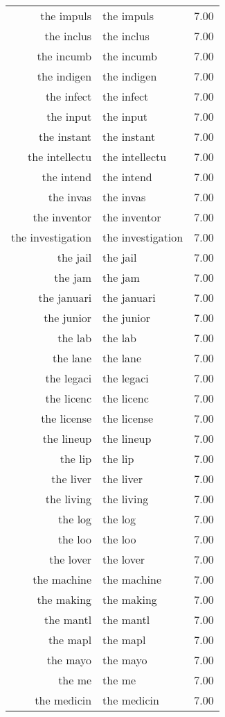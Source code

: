 \begin{table}[ht]
\begin{tabular}{rlr}
  the impuls & the impuls & 7.00 \\ 
  the inclus & the inclus & 7.00 \\ 
  the incumb & the incumb & 7.00 \\ 
  the indigen & the indigen & 7.00 \\ 
  the infect & the infect & 7.00 \\ 
  the input & the input & 7.00 \\ 
  the instant & the instant & 7.00 \\ 
  the intellectu & the intellectu & 7.00 \\ 
  the intend & the intend & 7.00 \\ 
  the invas & the invas & 7.00 \\ 
  the inventor & the inventor & 7.00 \\ 
  the investigation & the investigation & 7.00 \\ 
  the jail & the jail & 7.00 \\ 
  the jam & the jam & 7.00 \\ 
  the januari & the januari & 7.00 \\ 
  the junior & the junior & 7.00 \\ 
  the lab & the lab & 7.00 \\ 
  the lane & the lane & 7.00 \\ 
  the legaci & the legaci & 7.00 \\ 
  the licenc & the licenc & 7.00 \\ 
  the license & the license & 7.00 \\ 
  the lineup & the lineup & 7.00 \\ 
  the lip & the lip & 7.00 \\ 
  the liver & the liver & 7.00 \\ 
  the living & the living & 7.00 \\ 
  the log & the log & 7.00 \\ 
  the loo & the loo & 7.00 \\ 
  the lover & the lover & 7.00 \\ 
  the machine & the machine & 7.00 \\ 
  the making & the making & 7.00 \\ 
  the mantl & the mantl & 7.00 \\ 
  the mapl & the mapl & 7.00 \\ 
  the mayo & the mayo & 7.00 \\ 
  the me & the me & 7.00 \\ 
  the medicin & the medicin & 7.00 \\ 

\end{tabular}
\end{table}
